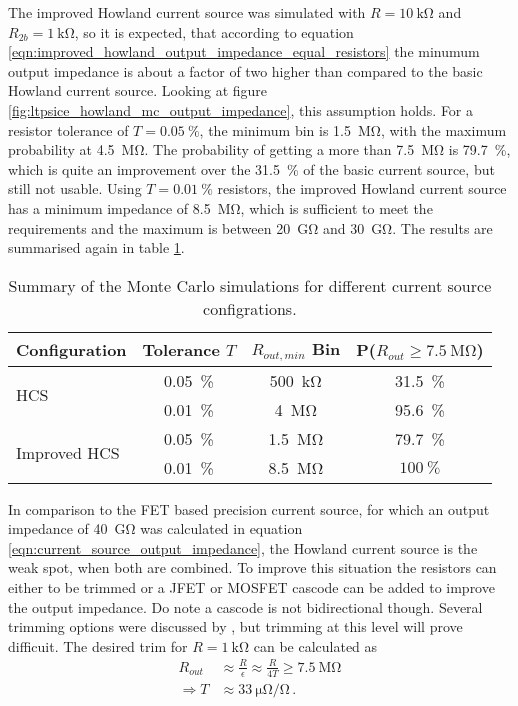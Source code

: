 The improved Howland current source was simulated with $R=\qty{10}{\kilo\ohm}$ and $R_{2b} = \qty{1}{\kilo\ohm}$, so it is expected, that according to equation \ref{eqn:improved_howland_output_impedance_equal_resistors} the minumum output impedance is about a factor of two higher than compared to the basic Howland current source. Looking at figure \ref{fig:ltpsice_howland_mc_output_impedance}, this assumption holds. For a resistor tolerance of $T=\qty{0.05}{\percent}$, the minimum bin is \qty{1.5}{\mega\ohm}, with the maximum probability at \qty{4.5}{\mega\ohm}. The probability of getting a more than \qty{7.5}{\mega\ohm} is \qty{79.7}{\percent}, which is quite an improvement over the \qty{31.5}{\percent} of the basic current source, but still not usable. Using $T=\qty{0.01}{\percent}$ resistors, the improved Howland current source has a minimum impedance of \qty{8.5}{\mega\ohm}, which is sufficient to meet the requirements and the maximum is between \qty{20}{\giga\ohm} and \qty{30}{\giga\ohm}. The results are summarised again in table \ref{tab:howland_current_source_summary}.

\begin{table}[hb]
    \centering
    \begin{tabular}{lccc}
        \toprule
        Configuration& Tolerance $T$ & $R_{out, min}$ Bin& P($R_{out} \geq \qty{7.5}{\mega\ohm}$) \\
        \midrule
        \multirow{2}{*}{HCS} & \qty{0.05}{\percent}& \qty{500}{\kilo\ohm}& \qty{31.5}{\percent}\\
        & \qty{0.01}{\percent} & \qty{4}{\mega\ohm}& \qty{95.6}{\percent} \\
        \multirow{2}{*}{Improved HCS} & \qty{0.05}{\percent}& \qty{1.5}{\mega\ohm}& \qty{79.7}{\percent} \\
        & \qty{0.01}{\percent}& \qty{8.5}{\mega\ohm}& $\qty{100}{\percent}$\\
        \bottomrule
    \end{tabular}
    \caption{Summary of the Monte Carlo simulations for different current source configrations.}
    \label{tab:howland_current_source_summary}
\end{table}

In comparison to the FET based precision current source, for which an output impedance of \qty{40}{\giga\ohm} was calculated in equation \ref{eqn:current_source_output_impedance}, the Howland current source is the weak spot, when both are combined. To improve this situation the resistors can either to be trimmed or a JFET or MOSFET cascode can be added to improve the output impedance. Do note a cascode is not bidirectional though. Several trimming options were discussed by \citeauthor{howland_pease} \cite{howland_pease}, but trimming at this level will prove difficuit. The desired trim for $R=\qty{1}{\kilo\ohm}$ can be calculated as
\begin{align*}
    R_{out} &\approx \frac{R}{\epsilon} \approx \frac{R}{4T} \geq \qty{7.5}{\mega\ohm}\\
    \Rightarrow T &\approx \qty{33}{\micro\ohm \per\ohm}\,.
\end{align*}

